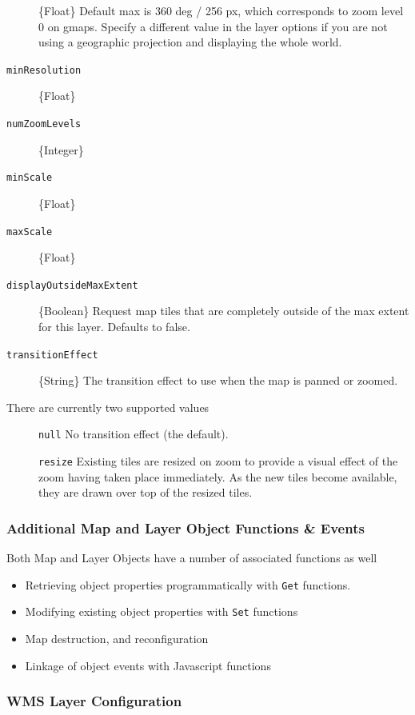 \documentclass[]{article}
\begin{document}
\begin{description}
\{Float\} Default max is 360 deg / 256 px, which corresponds to zoom
level 0 on gmaps. Specify a different value in the layer options if you
are not using a geographic projection and displaying the whole world.
\item[\texttt{minResolution}]
\{Float\}
\item[\texttt{numZoomLevels}]
\{Integer\}
\item[\texttt{minScale}]
\{Float\}
\item[\texttt{maxScale}]
\{Float\}
\item[\texttt{displayOutsideMaxExtent}]
\{Boolean\} Request map tiles that are completely outside of the max
extent for this layer. Defaults to false.
\item[\texttt{transitionEffect}]
\{String\} The transition effect to use when the map is panned or
zoomed.
\item[There are currently two supported values]
\texttt{null} No transition effect (the default).

\texttt{resize} Existing tiles are resized on zoom to provide a visual
effect of the zoom having taken place immediately. As the new tiles
become available, they are drawn over top of the resized tiles.
\end{description}

\subsubsection{Additional Map and Layer Object Functions \&
Events}\label{additional-map-and-layer-object-functions-events}

Both Map and Layer Objects have a number of associated functions as well

\begin{itemize}
\itemsep1pt\parskip0pt
\item
  Retrieving object properties programmatically with \texttt{Get}
  functions.
\item
  Modifying existing object properties with \texttt{Set} functions
\item
  Map destruction, and reconfiguration
\item
  Linkage of object events with Javascript functions
\end{itemize}

\subsubsection{WMS Layer Configuration}\label{wms-layer-configuration}
\end{document}
